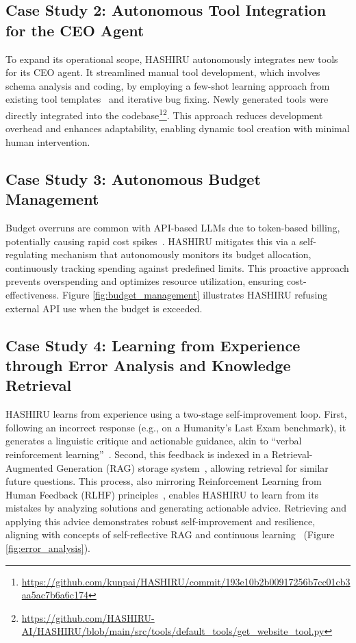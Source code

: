 \documentclass[conference]{IEEEtran}
\begin{document}
\subsection{Case Study 2: Autonomous Tool Integration for the CEO Agent}
\label{sec:casestudy2_tools}
To expand its operational scope, HASHIRU autonomously integrates new tools for its CEO agent. It streamlined manual tool development, which involves schema analysis and coding, by employing a few-shot learning approach from existing tool templates~\cite{brown2020language} and iterative bug fixing. Newly generated tools were directly integrated into the codebase\footnote{\url{https://github.com/kunpai/HASHIRU/commit/193e10b2b00917256b7cc01cb3aa5ac7b6a6c174}}\footnote{\url{https://github.com/HASHIRU-AI/HASHIRU/blob/main/src/tools/default_tools/get_website_tool.py}}. This approach reduces development overhead and enhances adaptability, enabling dynamic tool creation with minimal human intervention.

\subsection{Case Study 3: Autonomous Budget Management}
\label{sec:casestudy3_budget}
Budget overruns are common with API-based LLMs due to token-based billing, potentially causing rapid cost spikes~\cite{gemini_reddit,openai_sos,openai_costs}. HASHIRU mitigates this via a self-regulating mechanism that autonomously monitors its budget allocation, continuously tracking spending against predefined limits. This proactive approach prevents overspending and optimizes resource utilization, ensuring cost-effectiveness. Figure \ref{fig:budget_management} illustrates HASHIRU refusing external API use when the budget is exceeded.

\subsection{Case Study 4: Learning from Experience through Error Analysis and Knowledge Retrieval}
\label{sec:casestudy4_experiential_learning}
HASHIRU learns from experience using a two-stage self-improvement loop. First, following an incorrect response (e.g., on a Humanity's Last Exam benchmark), it generates a linguistic critique and actionable guidance, akin to ``verbal reinforcement learning''~\cite{shinn2023reflexion}. Second, this feedback is indexed in a Retrieval-Augmented Generation (RAG) storage system~\cite{lewis2021retrievalaugmentedgenerationknowledgeintensivenlp}, allowing retrieval for similar future questions. This process, also mirroring Reinforcement Learning from Human Feedback (RLHF) principles~\cite{ziegler2019fine,ouyang2022training}, enables HASHIRU to learn from its mistakes by analyzing solutions and generating actionable advice. Retrieving and applying this advice demonstrates robust self-improvement and resilience, aligning with concepts of self-reflective RAG and continuous learning~\cite{asai2023self,shinn2023reflexion} (Figure \ref{fig:error_analysis}).
\end{document}
